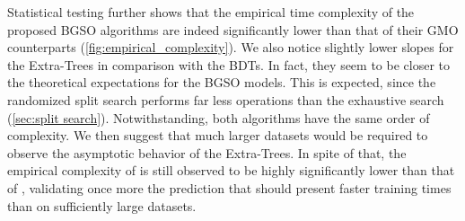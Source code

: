 Statistical testing further shows that the empirical time complexity of the proposed BGSO algorithms are indeed significantly lower than that of their GMO counterparts (\autoref{fig:empirical_complexity}).
%
%
We also notice slightly lower slopes for the Extra-Trees in comparison with the BDTs. In fact, they seem to be closer to the theoretical expectations for the BGSO models. This is expected,
since the randomized split search performs far less operations than the exhaustive search (\autoref{sec:split search}). Notwithstanding, both algorithms have the same order of complexity.
%
We then suggest that much larger datasets would be required to observe the asymptotic behavior of the Extra-Trees.
In spite of that, the empirical complexity of  is still observed to be highly significantly lower than that of , validating once more the prediction that  should present faster training times than  on sufficiently large datasets.

